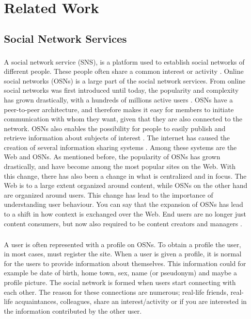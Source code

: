 \chapter{Related Work}
\label{chp:relatedwork} 


\section{Social Network Services}
\paragraph{}
A social network service (SNS), is a platform used to establish social networks of different people. These people often share a common interest or activity \cite{SNS}. Online social networks (OSNs) is a large part of the social network services. From online social networks was first introduced until today, the popularity and complexity has grown drastically, with a hundreds of millions active users \cite{OSN}. OSNs have a peer-to-peer architecture, and therefore makes it easy for members to initiate communication with whom they want, given that they are also connected to the network. OSNs also enables the possibility for people to easily publish and retrieve information about subjects of interest \cite{DPBook}. The internet has caused the creation of several information sharing systems \cite{OSNpaper}. Among these systems are the Web and OSNs. As mentioned before, the popularity of OSNs has grown drastically, and have become among the most popular sites on the Web. With this change, there has also been a change in what is centralized and in focus. The Web is to a large extent organized around content, while OSNs on the other hand are organized around users. This change has lead to the importance of understanding user behaviour. You can say that the expansion of OSNs has lead to a shift in how context is exchanged over the Web. End users are no longer just content consumers, but now also required to be content creators and managers \cite{expectations}.

\paragraph{}
A user is often represented with a profile on OSNs. To obtain a profile the user, in most cases, must register the site. When a user is given a profile, it is normal for the users to provide information about themselves. This information could for example be date of birth, home town, sex, name (or pseudonym) and maybe a profile picture. The social network is formed when users start connecting with each other. The reason for these connections are numerous; real-life friends, real-life acquaintances, colleagues, share an interest/activity or if you are interested in the information contributed by the other user. 

